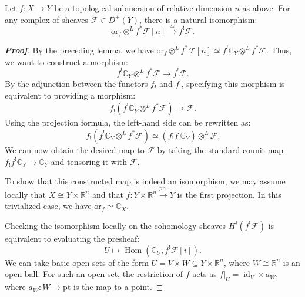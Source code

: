 \begin{theorem}
Let $f \colon X \longrightarrow Y$ be a topological submersion of relative dimension $n$ as above. For any complex of sheaves $\mathcal{F} \in D^+(Y)$, there is a natural isomorphism:
\begin{equation*}
    \text{or}_f \otimes^{L} f^* \mathcal{F}[n] \xrightarrow{\simeq} f^! \mathcal{F}.
\end{equation*}
\end{theorem}

\begin{proof}[\textbf{Proof}]
By the preceding lemma, we have $\text{or}_f \otimes^{L} f^* \mathcal{F}[n] \simeq f^! \mathbb{C}_Y \otimes^{L} f^* \mathcal{F}$. Thus, we want to construct a morphism:
\begin{equation*}
    f^! \mathbb{C}_Y \otimes^{L} f^* \mathcal{F} \longrightarrow f^! \mathcal{F}.
\end{equation*}
By the adjunction between the functors $f_!$ and $f^!$, specifying this morphism is equivalent to providing a morphism:
\begin{equation*}
    f_! \left( f^! \mathbb{C}_Y \otimes^{L} f^* \mathcal{F} \right) \longrightarrow \mathcal{F}.
\end{equation*}
Using the projection formula, the left-hand side can be rewritten as:
\begin{equation*}
    f_! \left( f^! \mathbb{C}_Y \otimes^{L} f^* \mathcal{F} \right) \simeq (f_! f^! \mathbb{C}_Y) \otimes^{L} \mathcal{F}.
\end{equation*}
We can now obtain the desired map to $\mathcal{F}$ by taking the standard counit map $f_! f^! \mathbb{C}_Y \longrightarrow \mathbb{C}_Y$ and tensoring it with $\mathcal{F}$.

To show that this constructed map is indeed an isomorphism, we may assume locally that $X \cong Y \times \mathbb{R}^n$ and that $f \colon Y \times \mathbb{R}^n \xrightarrow{pr_1} Y$ is the first projection. In this trivialized case, we have $\text{or}_f \simeq \mathbb{C}_X$.

Checking the isomorphism locally on the cohomology sheaves $H^i(f^! \mathcal{F})$ is equivalent to evaluating the presheaf:
\begin{equation*}
    U \longmapsto \operatorname{Hom}(\mathbb{C}_U, f^! \mathcal{F}[i]).
\end{equation*}
We can take basic open sets of the form $U = V \times W \subseteq Y \times \mathbb{R}^n$, where $W \cong \mathbb{R}^n$ is an open ball. 
For such an open set, the restriction of $f$ acts as $f|_U = \operatorname{id}_V \times a_W$, where $a_W \colon W \longrightarrow \text{pt}$ is the map to a point.


\end{proof}
